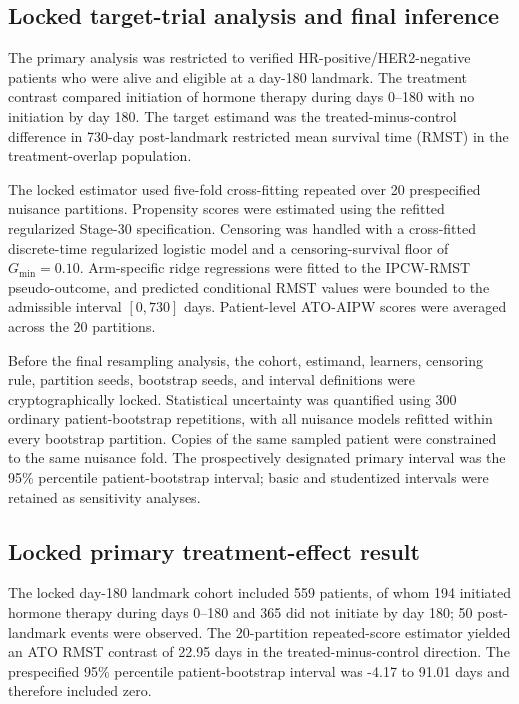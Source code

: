 
\subsection{Locked target-trial analysis and final inference}

The primary analysis was restricted to verified HR-positive/HER2-negative patients who were alive and eligible at a day-180 landmark. The treatment contrast compared initiation of hormone therapy during days 0--180 with no initiation by day 180. The target estimand was the treated-minus-control difference in 730-day post-landmark restricted mean survival time (RMST) in the treatment-overlap population.

The locked estimator used five-fold cross-fitting repeated over 20 prespecified nuisance partitions. Propensity scores were estimated using the refitted regularized Stage-30 specification. Censoring was handled with a cross-fitted discrete-time regularized logistic model and a censoring-survival floor of $G_{\min}=0.10$. Arm-specific ridge regressions were fitted to the IPCW-RMST pseudo-outcome, and predicted conditional RMST values were bounded to the admissible interval $[0,730]$ days. Patient-level ATO-AIPW scores were averaged across the 20 partitions.

Before the final resampling analysis, the cohort, estimand, learners, censoring rule, partition seeds, bootstrap seeds, and interval definitions were cryptographically locked. Statistical uncertainty was quantified using 300 ordinary patient-bootstrap repetitions, with all nuisance models refitted within every bootstrap partition. Copies of the same sampled patient were constrained to the same nuisance fold. The prospectively designated primary interval was the 95\% percentile patient-bootstrap interval; basic and studentized intervals were retained as sensitivity analyses.

\subsection{Locked primary treatment-effect result}

The locked day-180 landmark cohort included 559 patients, of whom 194 initiated hormone therapy during days 0--180 and 365 did not initiate by day 180; 50 post-landmark events were observed. The 20-partition repeated-score estimator yielded an ATO RMST contrast of 22.95 days in the treated-minus-control direction. The prespecified 95\% percentile patient-bootstrap interval was -4.17 to 91.01 days and therefore included zero.

